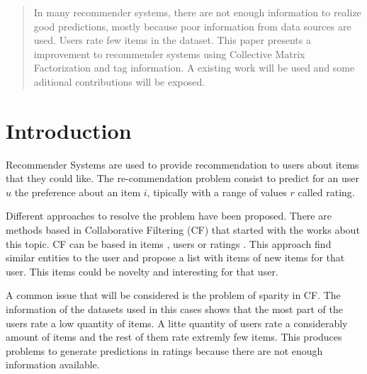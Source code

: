 \documentclass{sig-alternate}
\begin{document}
\maketitle
\begin{abstract}
In many recommender systems, there are not enough information to realize good predictions, mostly because poor information from data sources are used. Users rate few items in the dataset. This paper presents a improvement to recommender systems using Collective Matrix Factorization and tag information. A existing work will be used and some aditional contributions will be exposed. 
\end{abstract}




\section{Introduction}

Recommender Systems are used to provide recommendation to users about items that they could like. The re-commendation problem consist to predict for an user $u$ the preference about an item $i$, tipically with a range of values $r$ called rating. 

Different approaches to resolve the problem have been proposed. There are methods based in Collaborative Filtering (CF) \cite{schafer2007collaborative} that started with the works about this topic. CF can be based in items \cite{sarwar2001item}, users \cite{herlocker1999algorithmic} or ratings \cite{lemire2005slope}. This approach find similar entities to the user and propose a list with items of new items for that user. This items could be novelty and interesting for that user. 

A common issue that will be considered is the problem of sparity in CF. The information of the datasets used in this cases shows that the most part of the users rate a low quantity of items. A litte quantity of users rate a considerably amount of items and the rest of them rate extremly few items. This produces problems to generate predictions in ratings because there are not enough information available.
\end{document}
